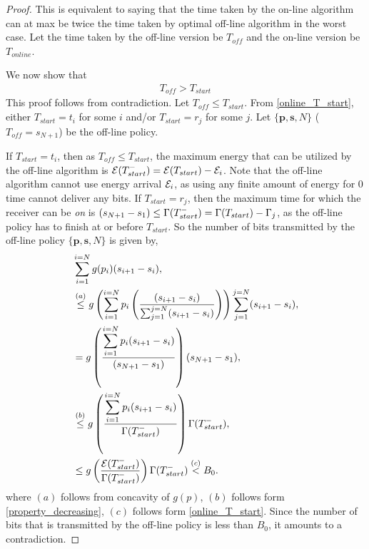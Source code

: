 \begin{proof}
This is equivalent to saying that the time taken by the on-line algorithm can at max be twice the time taken by optimal off-line algorithm in the worst case. Let the time taken by the off-line version be $T_{off}$ and the on-line version be $T_{online}$. 

We now show that 
\begin{align}
T_{off} > T_{start}
\label{online_time}
\end{align}
This proof follows from contradiction. Let $T_{off}\le T_{start}$. From \eqref{online_T_start}, either $T_{start}=t_i$ for some $i$ and/or $T_{start}=r_j$ for some $j$. Let $\{\textbf{p},\textbf{s},N\}$ ($T_{off}=s_{N+1}$) be the off-line policy.

If $T_{start}=t_i$, then as $T_{off}\le T_{start}$, the maximum energy that can be utilized by the off-line algorithm is $\mathcal{E}(T_{start}^-)=\mathcal{E}(T_{start})-\mathcal{E}_i$. Note that the off-line algorithm cannot use energy arrival $\mathcal{E}_i$, as using any finite amount of energy for 0 time cannot deliver any bits. If $T_{start}=r_j$, then the maximum time for which the receiver can be \textit{on} is $(s_{N+1}-s_1) \le\Gamma(T_{start}^-)=\Gamma(T_{start})-\Gamma_j$, as the off-line policy has to finish at or before $T_{start}$. 
So the number of bits transmitted by the off-line policy $\{\textbf{p},\textbf{s},N\}$ is given by,
\begin{align}
&\sum_{i=1}^{i=N} g(p_i)(s_{i+1}-s_{i}),
\\
&\stackrel{(a)}{\le} g\left(\sum_{i=1}^{i=N}p_i\left(\frac{(s_{i+1}-s_{i})}{\sum_{j=1}^{j=N}(s_{i+1}-s_{i})}\right)\right) \sum_{j=1}^{j=N} (s_{i+1}-s_{i}),\label{online_eq_3}
\\
&=g\left(\frac{\displaystyle\sum_{i=1}^{i=N}p_i(s_{i+1}-s_{i})}{(s_{N+1}-s_{1})}\right)(s_{N+1}-s_{1}),\label{online_eq_4} 
\\
&\stackrel{(b)}{\le} g\left(\frac{\displaystyle\sum_{i=1}^{i=N}p_i(s_{i+1}-s_{i})}{\TRx(T_{start}^-)}\right)\TRx(T_{start}^-), \label{online_eq_1}
\\
&\le g\left(\frac{\ETx(T_{start}^-)}{\TRx(T_{start}^-)}\right)\TRx(T_{start}^-)\stackrel{(c)}{<}B_0.\label{online_eq_2}
\end{align}
where $(a)$ follows from concavity of $g(p)$, $(b)$ follows form \eqref{property_decreasing}, $(c)$ follows form \eqref{online_T_start}. Since the number of bits that is transmitted by the off-line policy is less than $B_0$, it amounts to a contradiction.

\end{proof}
